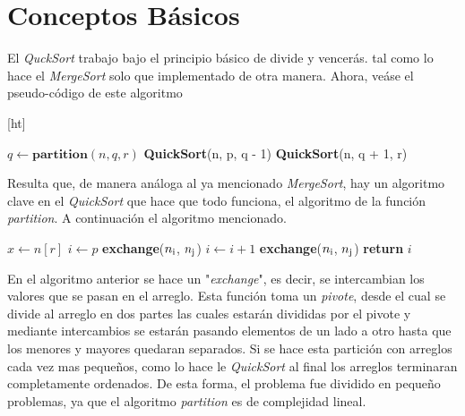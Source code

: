 \documentclass[12pt,twoside]{article}
\begin{document}
\section{Conceptos B\'asicos}
El \textit{QuckSort} trabajo bajo el principio b\'asico de divide y vencer\'as. tal como lo hace el \textit{MergeSort} solo que implementado de otra manera. Ahora, ve\'ase el pseudo-c\'odigo de este algoritmo
\begin{center}[ht]
    \begin{algorithmic}[1]
                \State $q \longleftarrow \textbf{partition}(n, q, r)$
                \State \textbf{QuickSort}(n, p, q - 1)
                \State \textbf{QuickSort}(n, q + 1, r)
            \EndIf
        \EndProcedure
    \end{algorithmic}
\end{center}
Resulta que, de manera an\'aloga al ya mencionado \textit{MergeSort}, hay un algoritmo clave en el \textit{QuickSort} que hace que todo funciona, el algoritmo de la funci\'on \textit{partition}. A continuaci\'on el algoritmo mencionado.
\begin{center}
    \begin{algorithmic}[1]
            \State $x \longleftarrow n[r]$
            \State $i \longleftarrow p$
                    \State \textbf{exchange}($n\textsubscript{i}$, $n\textsubscript{j}$)
                    \State $i \longleftarrow i + 1$
                \EndIf
            \EndFor
            \State \textbf{exchange}($n\textsubscript{i}$, $n\textsubscript{j}$)
            \State \textbf{return} $i$
        \EndProcedure
    \end{algorithmic}
\end{center}
En el algoritmo anterior se hace un "\textit{exchange}", es decir, se intercambian los valores que se pasan en el arreglo. Esta funci\'on toma un \textit{pivote}, desde el cual se divide al arreglo en dos partes las cuales estar\'an divididas por el pivote y mediante intercambios se estar\'an pasando elementos de un lado a otro hasta que los menores y mayores quedaran separados. Si se hace esta partici\'on con arreglos cada vez mas pequeños, como lo hace le \textit{QuickSort} al final los arreglos terminaran completamente ordenados. De esta forma, el problema fue dividido en pequeño problemas, ya que el algoritmo \textit{partition} es de complejidad lineal.
\end{document}
